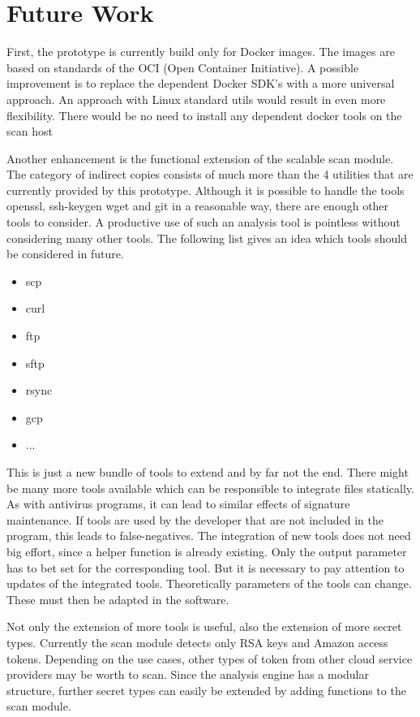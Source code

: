 \chapter{Future Work}
\label{ch:end:future}
First, the prototype is currently build only for Docker images. 
The images are based on standards of the OCI (Open Container Initiative). 
A possible improvement is to replace the dependent Docker SDK's with a more universal approach. 
An approach with Linux standard utils would result in even more flexibility. 
There would be no need to install any dependent docker tools on the scan host

Another enhancement is the functional extension of the scalable scan module.
The category of indirect copies consists of much more than the 4 utilities that are currently provided by this prototype.
Although it is possible to handle the tools openssl, ssh-keygen wget and git in a reasonable way, there are enough other tools to consider. A productive use of such an analysis tool is pointless without considering many other tools.
The following list gives an idea which tools should be considered in future.
\begin{itemize}
\item scp
\item curl
\item ftp
\item sftp
\item rsync
\item gcp
\item ...
\end{itemize}
This is just a new bundle of tools to extend and by far not the end.
There might be many more tools available which can be responsible to integrate files statically.
As with antivirus programs, it can lead to similar effects of signature maintenance.
If tools are used by the developer that are not included in the program, this leads to false-negatives.
The integration of new tools does not need big effort, since a helper function is already existing.
Only the output parameter has to bet set for the corresponding tool.
But it is necessary to pay attention to updates of the integrated tools.
Theoretically parameters of the tools can change. 
These must then be adapted in the software.

Not only the extension of more tools is useful, also the extension of more secret types.
Currently the scan module detects only RSA keys and Amazon access tokens.
Depending on the use cases, other types of token from other cloud service providers may be worth to scan.
Since the analysis engine has a modular structure, further secret types can easily be extended by adding functions to the scan module.

